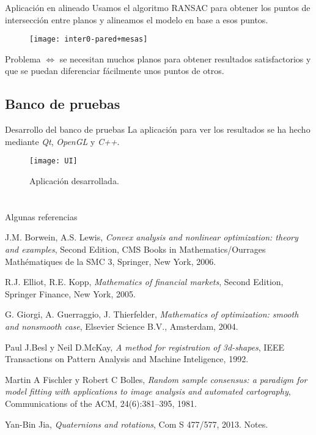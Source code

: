 \documentclass[9pt]{beamer}
\begin{document}
	\begin{frame}{Aplicación en alineado}
	Usamos el algoritmo RANSAC para obtener los puntos de intersección entre planos y alineamos el modelo en base a esos puntos.
	\begin{figure}[h!]
		\texttt{[image: inter0-pared+mesas]}		
	\end{figure} 

	Problema $ \Longleftrightarrow $ se necesitan muchos planos para obtener resultados satisfactorios y que se puedan diferenciar fácilmente unos puntos de otros.
	
	\end{frame}

	\subsection{Banco de pruebas}
	\begin{frame}{Desarrollo del banco de pruebas}
		La aplicación para ver los resultados se ha hecho mediante \textit{Qt}, \textit{OpenGL} y \textit{C++}.
		\begin{figure}[h!]
			\texttt{[image: UI]}
			\caption{Aplicación desarrollada.}
		\end{figure} 
	\end{frame}

	\section{}
	\begin{frame}{Algunas referencias}
		\justifying
		\begin{thebibliography}{X}
			 J.M. Borwein, A.S. Lewis, \textsl{Convex analysis and nonlinear optimization: theory and examples}, Second Edition, CMS Books in Mathematics/Ourrages Mathématiques de la SMC 3, Springer, New York, 2006.
			
			 R.J. Elliot, R.E. Kopp, \textsl{Mathematics of financial markets}, Second Edition, Springer Finance, New York, 2005.
			
			 G. Giorgi, A. Guerraggio, J. Thierfelder, \textsl{Mathematics of optimization: smooth and nonsmooth case}, Elsevier Science B.V., Amsterdam, 2004.
			
			 Paul J.Besl y Neil D.McKay, \textsl{A method for registration of 3d-shapes}, IEEE Transactions on Pattern Analysis and Machine Inteligence, 1992.
			
			 Martin A Fischler y Robert C Bolles, \textsl{Random sample consensus: a paradigm for model fitting with applications to image analysis and automated cartography}, Communications of the ACM, 24(6):381–395, 1981.
			
			 Yan-Bin Jia, \textsl{Quaternions and rotations}, Com S 477/577, 2013.
			Notes.
		
		\end{thebibliography}
	\end{frame}
	
\end{document}
